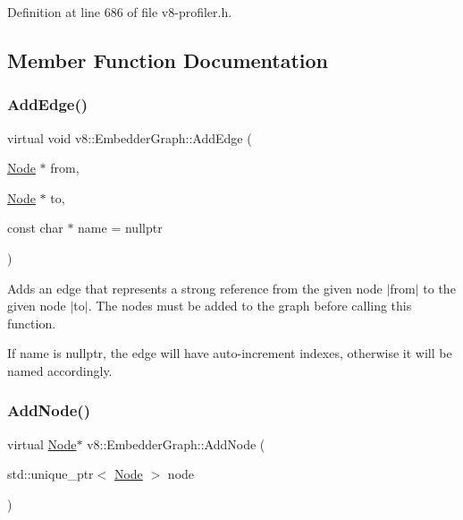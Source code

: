 Definition at line 686 of file v8-\/profiler.\+h.



\subsection{Member Function Documentation}
\mbox{\label{classv8_1_1EmbedderGraph_a81b1c7dd4d0387ec50037b0778b8af11}} 
\subsubsection{\texorpdfstring{Add\+Edge()}{AddEdge()}}
{\footnotesize\ttfamily virtual void v8\+::\+Embedder\+Graph\+::\+Add\+Edge (\begin{DoxyParamCaption}\item[{\mbox{\hyperlink{classv8_1_1EmbedderGraph_1_1Node}{Node}} $\ast$}]{from,  }\item[{\mbox{\hyperlink{classv8_1_1EmbedderGraph_1_1Node}{Node}} $\ast$}]{to,  }\item[{const char $\ast$}]{name = {\ttfamily nullptr} }\end{DoxyParamCaption})\hspace{0.3cm}{\ttfamily [pure virtual]}}

Adds an edge that represents a strong reference from the given node $\vert$from$\vert$ to the given node $\vert$to$\vert$. The nodes must be added to the graph before calling this function.

If name is nullptr, the edge will have auto-\/increment indexes, otherwise it will be named accordingly. \mbox{\label{classv8_1_1EmbedderGraph_a57afbce6126e5cd82b66f66b018a18e2}} 
\subsubsection{\texorpdfstring{Add\+Node()}{AddNode()}}
{\footnotesize\ttfamily virtual \mbox{\hyperlink{classv8_1_1EmbedderGraph_1_1Node}{Node}}$\ast$ v8\+::\+Embedder\+Graph\+::\+Add\+Node (\begin{DoxyParamCaption}\item[{std\+::unique\+\_\+ptr$<$ \mbox{\hyperlink{classv8_1_1EmbedderGraph_1_1Node}{Node}} $>$}]{node }\end{DoxyParamCaption})\hspace{0.3cm}{\ttfamily [pure virtual]}}


